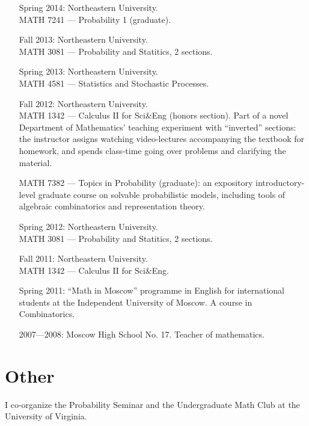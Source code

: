 \documentclass[letterpaper,11pt]{article}
\begin{document}
\begin{itemize}
  \item[Spring 2014:]   
  Northeastern University. \\
  MATH 7241 --- 
  Probability 1 (graduate).

  \item[Fall 2013:]   
  Northeastern University. \\
  MATH 3081 --- 
  Probability and Statitics, 2 sections.
  \item[Spring 2013:] 
  Northeastern University. 
  \\
  MATH 4581 --- Statistics and Stochastic Processes.
  \item[Fall 2012:]
  Northeastern University. 
  \\
  MATH 1342 --- 
  Calculus II for Sci\&Eng (honors section). Part of a novel Department of Mathematics' teaching experiment with ``inverted'' sections: the instructor assigns watching video-lectures accompanying the textbook for homework, and spends class-time going over problems and clarifying the material.

  MATH 7382 --- Topics in Probability (graduate): an expository introductory-level graduate course on solvable probabilistic models, including tools of algebraic combinatorics and representation theory.

  \item[Spring 2012:] 
  Northeastern University. \\
  MATH 3081 --- 
  Probability and Statitics, 2 sections.
  \item[Fall 2011:]
  Northeastern University.\\
  MATH 1342 --- 
  Calculus II for Sci\&Eng.
  \item[Spring 2011:]
  ``Math in Moscow'' programme in English for international students at the Independent University of Moscow. A course in Combinatorics.

  \item[2007---2008:]
  Moscow High School No. 17.
  Teacher of mathematics.
\end{itemize}

\section*{Other}

I co-organize the
Probability Seminar and the Undergraduate Math Club
at the University of Virginia.
\end{document}
